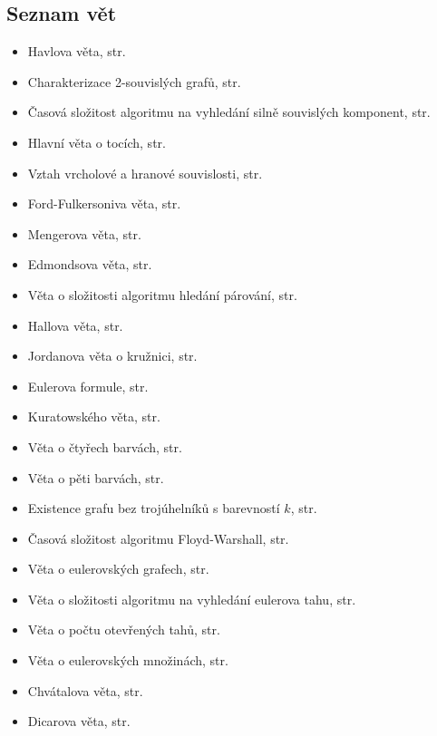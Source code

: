\subsection{Seznam vět}

\begin{itemize}
    \item Havlova věta, str. \pageref{lemma:havlova-veta}
    \item Charakterizace 2-souvislých grafů, str. \pageref{lemma:charakterizace-2-souvislosti}
    \item Časová složitost algoritmu na vyhledání silně souvislých komponent, str. \pageref{lemma:silne-komponenty-slozitost}
    \item Hlavní věta o tocích, str. \pageref{lemma:hlavni-veta-o-tocich}
    \item Vztah vrcholové a hranové souvislosti, str. \pageref{lemma:vztah-souvislosti}
    \item Ford-Fulkersoniva věta, str. \pageref{lemma:ford-fulkersonova-veta}
    \item Mengerova věta, str. \pageref{lemma:mengerova-veta}
    \item Edmondsova věta, str. \pageref{lemma:edmondsova-veta}
    \item Věta o složitosti algoritmu hledání párování, str. \pageref{lemma:slozitost-parovani}
    \item Hallova věta, str. \pageref{lemma:hallova-veta}
    \item Jordanova věta o kružnici, str. \pageref{lemma:jordanova-veta-o-kruznici}
    \item Eulerova formule, str. \pageref{lemma:eulerova-formule}
    \item Kuratowského věta, str. \pageref{lemma:kuratowskeho-veta}
    \item Věta o čtyřech barvách, str. \pageref{lemma:veta-o-ctyrech-barvach}
    \item Věta o pěti barvách, str. \pageref{lemma:veta-o-peti-barvach}
    \item Existence grafu bez trojúhelníků s barevností $k$, str. \pageref{lemma:graf-s-barevnosti-k}
    \item Časová složitost algoritmu Floyd-Warshall, str. \pageref{lemma:floyd-warshall-slozitost}
    \item Věta o eulerovských grafech, str. \pageref{lemma:veta-o-eulerovskych-grafech}
    \item Věta o složitosti algoritmu na vyhledání eulerova tahu, str. \pageref{lemma:eulerovsky-tah-slozitost}
    \item Věta o počtu otevřených tahů, str. \pageref{lemma:pocet-otevrenych-tahu}
    \item Věta o eulerovských množinách, str. \pageref{lemma:eulerovske-mnoziny}
    \item Chvátalova věta, str. \pageref{lemma:chvatalova-veta}
    \item Dicarova věta, str. \pageref{lemma:dicarova-veta}
\end{itemize}
